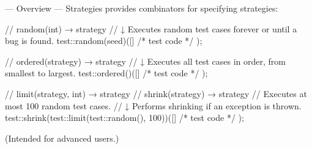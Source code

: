 \begin{frame}[fragile]{\halcheck{} --- Overview --- Strategies}
  \halcheck{} provides combinators for specifying strategies:

  \begin{cppcode}
    //   random(int) → strategy
    // ↓ Executes random test cases forever or until a bug is found.
    test::random(seed)([] { /* test code */ });
  \end{cppcode}

  \pause{}

  \begin{cppcode}
    //   ordered(strategy) → strategy
    // ↓ Executes all test cases in order, from smallest to largest.
    test::ordered()([] { /* test code */ });
  \end{cppcode}

  \pause{}

  \begin{cppcode}
    //   limit(strategy, int) → strategy
    //   shrink(strategy) → strategy
    //   Executes at most 100 random test cases.
    // ↓ Performs shrinking if an exception is thrown.
    test::shrink(test::limit(test::random(), 100))([] { /* test code */ });
  \end{cppcode}

  \pause{}

  (Intended for advanced users.)
\end{frame}


